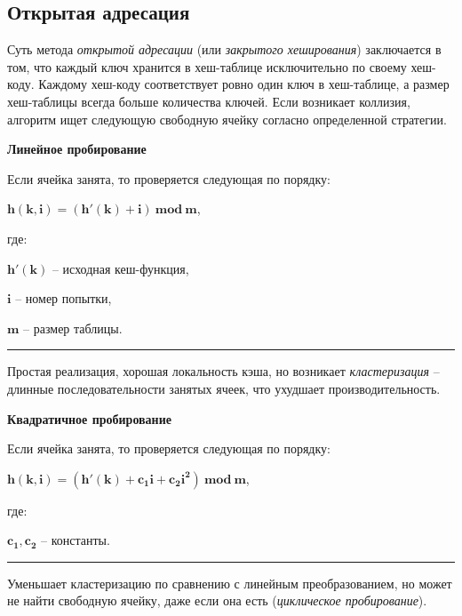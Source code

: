 \subsection{Открытая адресация} \label{sec:open_addressing}

Суть метода \textit{открытой адресации} (или \textit{закрытого хеширования}) заключается в том, что каждый ключ
хранится в хеш-таблице исключительно по своему хеш-коду. Каждому хеш-коду соответствует ровно один ключ в хеш-таблице,
а размер хеш-таблицы всегда больше количества ключей. Если возникает коллизия, алгоритм ищет следующую свободную ячейку
согласно определенной стратегии.
\vspace{5pt}

\begin{minipage}[t]{0.30\textwidth}
	\fontsize{8.5pt}{11pt}\selectfont
	\centerline{\small \textbf{Линейное пробирование}}\par

	Если ячейка занята, то проверяется следующая по порядку:\par
	\vspace{2pt}
	$\boldsymbol{h(k, i) = (h'(k) + i) \ mod \ m}$,\par
	\vspace{2pt}
	где:\par
	$\boldsymbol{h'(k)}$ -- исходная кеш-функция,\par
	$\boldsymbol{i}$ -- номер попытки,\par
	$\boldsymbol{m}$ -- размер таблицы.	

	\vspace{6pt}
	\hrule
	\vspace{6pt}

	Простая реализация, хорошая локальность кэша, но возникает \textit{кластеризация} -- длинные последовательности занятых ячеек, что ухудшает производительность.
\end{minipage}
\hfill
\begin{minipage}[t]{0.30\textwidth}
	\fontsize{8.5pt}{11pt}\selectfont
	\centerline{\small \textbf{Квадратичное пробирование}}\par

	Если ячейка занята, то проверяется следующая по порядку:\par
	\vspace{2pt}
	$\boldsymbol{h(k, i) = (h'(k) +  c_{1}i + c_{2}i^{2}) \ mod \ m}$,\par
	\vspace{2pt}
	где:\par
	$\boldsymbol{c_1, c_2}$ -- константы.

	\vspace{28pt}
	\hrule
	\vspace{6pt}

	Уменьшает кластеризацию по сравнению с линейным преобразованием, но может не найти свободную ячейку, даже если она есть (\textit{циклическое пробирование}).
\end{minipage}
